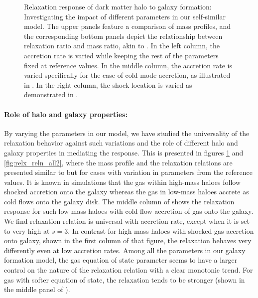 \begin{figure}[htbp]
\caption{Relaxation response of dark matter halo to galaxy formation: Investigating the impact of different parameters in our self-similar model. The upper panels feature a comparison of mass profiles, and the corresponding bottom panels depict the relationship between relaxation ratio and mass ratio, akin to . In the left column, the accretion rate is varied while keeping the rest of the parameters fixed at reference values. In the middle column, the accretion rate is varied specifically for the case of cold mode accretion, as illustrated in . In the right column, the shock location is varied as demonstrated in . }
\label{fig:relx_reln_all1}
\end{figure}


\paragraph{Role of halo and galaxy properties:}
By varying the parameters in our model, we have studied the universality of the relaxation behavior against such variations and the role of different halo and galaxy properties in mediating the response. This is presented in figures \ref{fig:relx_reln_all1} and \ref{fig:relx_reln_all2}, where the mass profile and the relaxation relations are presented similar to  but for cases with variation in parameters from the reference values. It is known in simulations that the gas within high-mass haloes follow shocked accretion onto the galaxy whereas the gas in low-mass haloes accrete as cold flows onto the galaxy disk. The middle column of  shows the relaxation response for such low mass haloes with cold flow accretion of gas onto the galaxy. We find relaxation relation is universal with accretion rate, except when it is set to very high at $s=3$. In contrast for high mass haloes with shocked gas accretion onto galaxy, shown in the first column of that figure, the relaxation behaves very differently even at low accretion rates. Among all the parameters in our galaxy formation model, the gas equation of state parameter seems to have a larger control on the nature of the relaxation relation with a clear monotonic trend. For gas with softer equation of state, the relaxation tends to be stronger (shown in the middle panel of ). 


